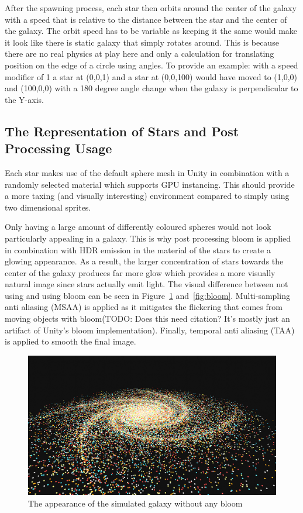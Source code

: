 After the spawning process, each star then orbits around the center of the galaxy with a speed that is relative to the distance between the star and the center of the galaxy. The orbit speed has to be variable as keeping it the same would make it look like there is static galaxy that simply rotates around. This is because there are no real physics at play here and only a calculation for translating position on the edge of a circle using angles. To provide an example: with a speed modifier of 1 a star at (0,0,1) and a star at (0,0,100) would have moved to (1,0,0) and (100,0,0) with a 180 degree angle change when the galaxy is perpendicular to the Y-axis. 

\subsection{The Representation of Stars and Post Processing Usage}
Each star makes use of the default sphere mesh in Unity in combination with a randomly selected material which supports GPU instancing. This should provide a more taxing (and visually interesting) environment compared to simply using two dimensional sprites. 

Only having a large amount of differently coloured spheres would not look particularly appealing in a galaxy. This is why post processing bloom is applied in combination with HDR emission in the material of the stars to create a glowing appearance. As a result, the larger concentration of stars towards the center of the galaxy produces far more glow which provides a more visually natural image since stars actually emit light. The visual difference between not using and using bloom can be seen in Figure~\ref{fig:nobloom} and~\ref{fig:bloom}.
Multi-sampling anti aliasing (MSAA) is applied as it mitigates the flickering that comes from moving objects with bloom(TODO: Does this need citation? It's mostly just an artifact of Unity's bloom implementation). Finally, temporal anti aliasing (TAA) is applied to smooth the final image. 

\begin{figure}[tbph]
    \centering
    \includegraphics[width=1\textwidth]{Figures/noBloom.png}
    \caption[Galaxy without bloom]{The appearance of the simulated galaxy without any bloom}
    \label{fig:nobloom}
\end{figure}

